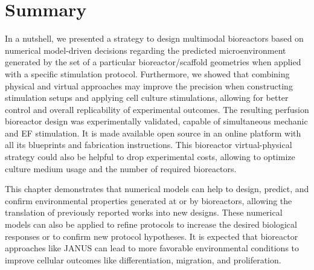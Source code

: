 \section{Summary}
In a nutshell, we presented a strategy to design multimodal bioreactors based on numerical model-driven decisions regarding the predicted microenvironment generated by the set of a particular bioreactor/scaffold geometries when applied with a specific stimulation protocol. Furthermore, we showed that combining physical and virtual approaches may improve the precision when constructing stimulation setups and applying cell culture stimulations, allowing for better control and overall replicability of experimental outcomes. The resulting perfusion bioreactor design was experimentally validated, capable of simultaneous mechanic and \acs{EF} stimulation. It is made available open source in an online platform with all its blueprints and fabrication instructions. This bioreactor virtual-physical strategy could also be helpful to drop experimental costs, allowing to optimize culture medium usage and the number of required bioreactors.

This chapter demonstrates that numerical models can help to design, predict, and confirm environmental properties generated at or by bioreactors, allowing the translation of previously reported works into new designs. These numerical models can also be applied to refine protocols to increase the desired biological responses or to confirm new protocol hypotheses. It is expected that bioreactor approaches like JANUS can lead to more favorable environmental conditions to improve cellular outcomes like differentiation, migration, and proliferation.




% 
%
%